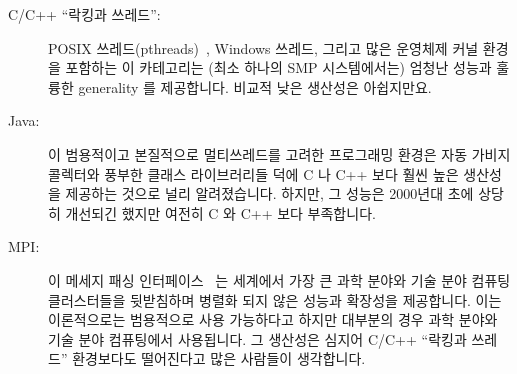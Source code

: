\begin{description}
\item[C/C++ ``락킹과 쓰레드'':] POSIX
	쓰레드(pthreads)~\cite{OpenGroup1997pthreads}, Windows 쓰레드, 그리고
	많은 운영체제 커널 환경을 포함하는 이 카테고리는 (최소 하나의 SMP
	시스템에서는) 엄청난 성능과 훌륭한 generality 를 제공합니다.
	비교적 낮은 생산성은 아쉽지만요.

\item[Java:] 이 범용적이고 본질적으로 멀티쓰레드를 고려한 프로그래밍 환경은
	자동 가비지 콜렉터와 풍부한 클래스 라이브러리들 덕에 C 나 C++ 보다 훨씬
	높은 생산성을 제공하는 것으로 널리 알려졌습니다.
	하지만, 그 성능은 2000년대 초에 상당히 개선되긴 했지만 여전히 C 와 C++
	보다 부족합니다.

\item[MPI:] 이 메세지 패싱 인터페이스~\cite{MPIForum2008} 는 세계에서 가장 큰
	과학 분야와 기술 분야 컴퓨팅 클러스터들을 뒷받침하며 병렬화 되지 않은
	성능과 확장성을 제공합니다.
	이는 이론적으로는 범용적으로 사용 가능하다고 하지만 대부분의 경우 과학
	분야와 기술 분야 컴퓨팅에서 사용됩니다.
	그 생산성은 심지어 C/C++ ``락킹과 쓰레드'' 환경보다도 떨어진다고 많은
	사람들이 생각합니다.

\end{description}
